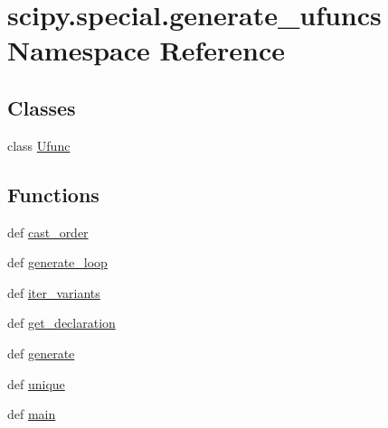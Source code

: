 \hypertarget{namespacescipy_1_1special_1_1generate__ufuncs}{}\section{scipy.\+special.\+generate\+\_\+ufuncs Namespace Reference}
\label{namespacescipy_1_1special_1_1generate__ufuncs}
\subsection*{Classes}
\begin{DoxyCompactItemize}
\item 
class \hyperlink{classscipy_1_1special_1_1generate__ufuncs_1_1Ufunc}{Ufunc}
\end{DoxyCompactItemize}
\subsection*{Functions}
\begin{DoxyCompactItemize}
\item 
def \hyperlink{namespacescipy_1_1special_1_1generate__ufuncs_aae3daffa4c00d017b8ce91f65b8ff491}{cast\+\_\+order}
\item 
def \hyperlink{namespacescipy_1_1special_1_1generate__ufuncs_a7d2eda0b9b16a473713bf414028345d6}{generate\+\_\+loop}
\item 
def \hyperlink{namespacescipy_1_1special_1_1generate__ufuncs_a77ea7742de71c91de77b3ccf80a3c923}{iter\+\_\+variants}
\item 
def \hyperlink{namespacescipy_1_1special_1_1generate__ufuncs_a1aa9b566b5536e4a6b12e06d23e4b589}{get\+\_\+declaration}
\item 
def \hyperlink{namespacescipy_1_1special_1_1generate__ufuncs_a54961f4d1ec5583e69813ac27eef7f74}{generate}
\item 
def \hyperlink{namespacescipy_1_1special_1_1generate__ufuncs_a323dc6c7af2ff45436891c467f1ac48c}{unique}
\item 
def \hyperlink{namespacescipy_1_1special_1_1generate__ufuncs_a681aebc6a70b118c937b784e987908bb}{main}
\end{DoxyCompactItemize}

